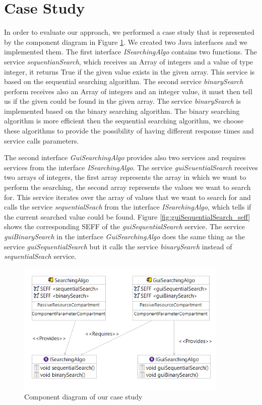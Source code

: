 \section{Case Study}
\label{sec:Case Study}
In order to evaluate our approach, we performed a case study that is represented by the component diagram in Figure \ref{fig:case_study}. We created two Java interfaces and we implemented them. The first interface \textit{ISearchingAlgo} contains two functions. The service \textit{sequentianSearch}, which receives an Array of integers and a value of type integer, it returns True if the given value exists in the given array. This service is based on the sequential searching algorithm. The second service \textit{binarySearch} perform receives also an Array of integers and an integer value, it must then tell us if the given could be found in the given array. The service \textit{binarySearch} is implemented based on the binary searching algorithm. The binary searching algorithm is more efficient then the sequential searching algorithm, we choose these algorithms to provide the possibility of having different response times and service calls parameters. 

The second interface \textit{GuiSearchingAlgo} provides also two services and requires services from the interface \textit{ISearchingAlgo}. The service \textit{guiSeuentialSearch} receives two arrays of integers, the first array represents the array in which we want to perform the searching, the second array represents the values we want to search for. This service iterates over the array of values that we want to search for and calls the service \textit{sequentialSeach} from the interface \textit{ISearchingAlgo}, which tells if the current searched value could be found. Figure \ref{fig:guiSequentialSearch_seff} shows the corresponding SEFF of the \textit{guiSequentialSearch} service. The service \textit{guiBinarySearch} in the interface \textit{GuiSearchingAlgo} does the same thing as the service \textit{guiSequentialSearch} but it calls the service \textit{binarySearch} instead of \textit{sequentialSeach} service. 

\begin{figure}[h]
\centering
\includegraphics[width=0.9\textwidth]{figures/case_study}
\caption{Component diagram of our case study}
\label{fig:case_study}
\end{figure}

